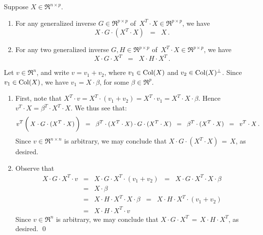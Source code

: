 \begin{lemma}
\label{XGXtXeqX}
\mbox{}\vskip 0.1cm\noindent
Suppose $X \in \Re^{n \times p}$.
\begin{enumerate}
\item
	For any generalized inverse $G \in \Re^{p \times p}$ of \,$X^{T} \cdot X \in \Re^{p \times p}$,
	we have
	\begin{equation*}
	X \cdot G \cdot (X^{T} \cdot X) \;\; = \;\; X\,.
	\end{equation*}
\item
	For any two generalized inverse $G, H \in \Re^{p \times p}$ of \,$X^{T} \cdot X \in \Re^{p \times p}$,
	we have
	\begin{equation*}
	X \cdot G \cdot X^{T} \;\; = \;\; X \cdot H \cdot X^{T}\,.
	\end{equation*}
\end{enumerate}
\end{lemma}
\proof
Let $v \in \Re^{n}$, and write $v = v_{1} + v_{2}$, where
$v_{1} \in \textnormal{Col}(X)$ and $v_{2} \in \textnormal{Col}(X)^{\perp}$.
Since $v_{1} \in \textnormal{Col}(X)$, we have $v_{1} = X \cdot \beta$,
for some $\beta \in \Re^{p}$.
\begin{enumerate}
\item
	First, note that
	$X^{T} \cdot v = X^{T} \cdot (v_{1} + v_{2}) = X^{T} \cdot v_{1} = X^{T} \cdot X \cdot \beta$.
	Hence $v^{T} \cdot X = \beta^{T} \cdot X^{T} \cdot X$.
	We thus see that:
	\begin{equation*}
	v^{T}\left(\,X \overset{{\color{white}\vert}}{\cdot} G \cdot (X^{T} \cdot X)\,\right)
	\;\; = \;\;
		\beta^{T} \cdot (X^{T} \cdot X) \cdot G \cdot (X^{T} \cdot X)
	\;\; = \;\;
		\beta^{T} \cdot (X^{T} \cdot X)
	\;\; = \;\;
		v^{T} \cdot X\,.
	\end{equation*}
	Since $v \in \Re^{n \times n}$ is arbitrary, we may conclude that
	$X \cdot G \cdot (X^{T} \cdot X) \,=\, X$,
	as desired.
\item
	Observe that
	\begin{eqnarray*}
	X \cdot G \cdot X^{T} \cdot v
	& = &
		X \cdot G \cdot X^{T} \cdot (v_{1} + v_{2})
	\;\; = \;\;
		X \cdot G \cdot X^{T} \cdot X \cdot \beta
	\\
	& = &
		X \cdot \beta
	\\
	& = &
		X \cdot H \cdot X^{T} \cdot X \cdot \beta
	\;\; = \;\;
		X \cdot H \cdot X^{T} \cdot (v_{1} + v_{2})
	\\
	& = &
		X \cdot H \cdot X^{T} \cdot v
	\end{eqnarray*}
	Since $v \in \Re^{n}$ is arbitrary, we may conclude that
	$X \cdot G \cdot X^{T} \,=\, X \cdot H \cdot X^{T}$,
	as desired.
	\qed
\end{enumerate}

